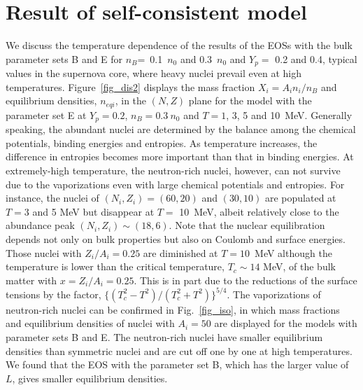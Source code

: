 \documentclass[preprint]{revtex4}
\begin{document}
\section{Result of self-consistent model  \label{sec:res1}}
We discuss the temperature dependence of the results of the EOSs with the bulk parameter sets B and E  for $n_B$=~0.1~$n_0$ and  0.3~$n_0$  and  $Y_p=$ 0.2 and  0.4, typical values in the supernova core, where heavy nuclei prevail even at high temperatures.
 Figure~\ref{fig_dis2}  displays the mass fraction $X_i=A_i n_i/n_B$ and equilibrium  densities, $n_{eqi}$, in the $(N,Z)$ plane for the model with the parameter set E at
$Y_p=0.2$, $n_B=0.3 \ n_0$ and $T=1$, 3, 5 and 10~MeV. %
Generally speaking, the abundant nuclei are determined  by the balance among the chemical potentials,  binding energies and entropies. 
As temperature increases,  the difference in entropies becomes more important than that in binding energies. 
At extremely-high temperature, the neutron-rich nuclei, however, can not survive due to the vaporizations even with large chemical potentials and entropies.
For instance, the nuclei of $(N_i,Z_i)=(60, 20)$  and $(30, 10)$ are populated at  $T=3$ and 5 MeV  but disappear  at $T=$ 10~MeV, albeit relatively close to the abundance peak  $(N_i,Z_i) \sim (18, 6)$. 
Note that the nuclear  equilibration  depends not only on bulk properties but also on Coulomb and  surface energies. %
Those nuclei with $Z_i/A_i=0.25$ %
are diminished  at $T=10$~MeV 
although the temperature is lower than  the critical temperature, $T_c \sim14$ MeV, of the bulk matter with $x=Z_i/A_i=0.25$.
This is in part due to the reductions of the surface tensions  by the factor, $\{ (T^2_c-T^2)/(T^2_c+T^2) \}^{5/4}$.
The vaporizations of neutron-rich nuclei  can be confirmed in Fig.~\ref{fig_iso},
 in which mass fractions  and equilibrium densities of nuclei with $A_i=50$ are displayed
for the models with parameter sets B and E.
The neutron-rich nuclei have smaller equilibrium densities than symmetric nuclei and are cut off one by one  at high temperatures.
We found that the EOS with the parameter set B, which has the larger value of $L$,  gives smaller equilibrium densities. 
\end{document}
